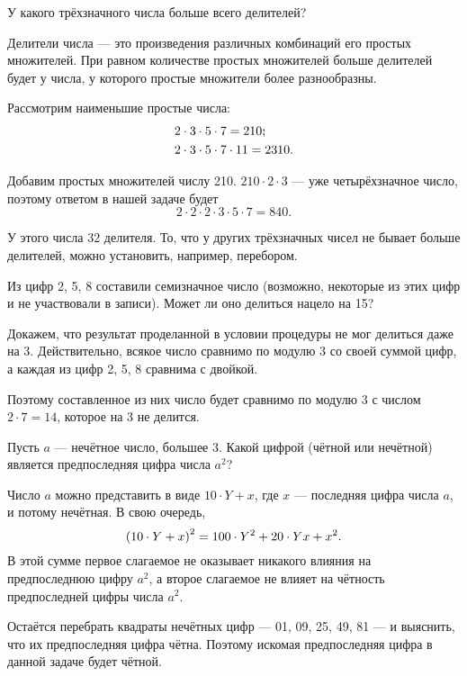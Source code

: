 \begin{itemize}

	\itA У какого трёхзначного числа больше всего делителей?
	
	\itr
	Делители числа — это произведения различных комбинаций его простых множителей. При равном количестве простых множителей больше делителей будет у числа, у которого простые множители более разнообразны.
	
	Рассмотрим наименьшие простые числа:
	\begin{align*}
		& 2 \cdot 3 \cdot 5 \cdot 7 = 210\scolon\\
		& 2 \cdot 3 \cdot 5 \cdot 7 \cdot 11 = 2310.
	\end{align*}
	
	Добавим простых множителей числу 210. $210 \cdot 2 \cdot 3$ — уже четырёхзначное число, поэтому ответом в нашей задаче будет
	$$2 \cdot 2 \cdot 2 \cdot 3 \cdot 5 \cdot 7 = 840.$$
	
	У этого числа 32 делителя. То, что у других трёхзначных чисел не бывает больше делителей, можно установить, например, перебором.
	
	\itB Из цифр 2, 5, 8 составили семизначное число (возможно, некоторые из этих цифр и не участвовали в записи). Может ли оно делиться нацело на 15?
	
	\itr Докажем, что результат проделанной в условии процедуры не мог делиться даже на 3. Действительно, всякое число сравнимо по модулю 3 со своей суммой цифр, а каждая из цифр 2, 5, 8 сравнима с двойкой.
	
	Поэтому составленное из них число будет сравнимо по модулю 3 с числом $2 \cdot 7 = 14$, которое на 3 не делится.
	
	\itC Пусть $a$ — нечётное число, большее 3. Какой цифрой (чётной или нечётной) является предпоследняя цифра числа $a^2$?
	
	\itr Число $a$ можно представить в виде $10 \cdot Y + x$, где $x$ — последняя цифра числа $a$, и потому нечётная. В свою очередь,
	$$\left( 10 \cdot Y + x\right)^2 = 100 \cdot Y^2 + 20 \cdot Yx + x^2.$$
	В этой сумме первое слагаемое не оказывает никакого влияния на предпоследнюю цифру $a^2$, а второе слагаемое не влияет на чётность предпоследней цифры числа $a^2$.
	
	Остаётся перебрать квадраты нечётных цифр — 01, 09, 25, 49, 81 — и выяснить, что их предпоследняя цифра чётна. Поэтому искомая предпоследняя цифра в данной задаче будет чётной.

\end{itemize}

